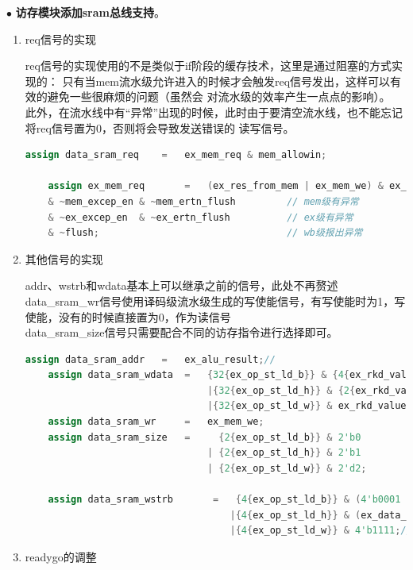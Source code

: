 \documentclass[11pt]{article}
\begin{document}
\noindent
$\bullet$
\textbf{访存模块添加sram总线支持}。
\vspace{1ex}
\begin{enumerate}
  \item req信号的实现
  
  req信号的实现使用的不是类似于if阶段的缓存技术，这里是通过阻塞的方式实现的：
  只有当mem流水级允许进入的时候才会触发req信号发出，这样可以有效的避免一些很麻烦的问题（虽然会
  对流水级的效率产生一点点的影响）。\\
  此外，在流水线中有“异常”出现的时候，此时由于要清空流水线，也不能忘记将req信号置为0，否则将会导致发送错误的
  读写信号。
  \begin{lstlisting}[language=verilog]
    assign data_sram_req    =   ex_mem_req & mem_allowin;

    assign ex_mem_req       =   (ex_res_from_mem | ex_mem_we) & ex_valid 
    & ~mem_excep_en & ~mem_ertn_flush         // mem级有异常
    & ~ex_excep_en  & ~ex_ertn_flush          // ex级有异常
    & ~flush;                                 // wb级报出异常
  \end{lstlisting}
  \item 其他信号的实现
  
  addr、wstrb和wdata基本上可以继承之前的信号，此处不再赘述\\
  data_sram_wr信号使用译码级流水级生成的写使能信号，有写使能时为1，写使能，没有的时候直接置为0，作为读信号\\
  data_sram_size信号只需要配合不同的访存指令进行选择即可。
  \begin{lstlisting}[language=verilog]
    assign data_sram_addr   =   ex_alu_result;//
    assign data_sram_wdata  =   {32{ex_op_st_ld_b}} & {4{ex_rkd_value[7:0]}}
                                |{32{ex_op_st_ld_h}} & {2{ex_rkd_value[15:0]}}
                                |{32{ex_op_st_ld_w}} & ex_rkd_value[31:0];
    assign data_sram_wr     =   ex_mem_we;
    assign data_sram_size   =     {2{ex_op_st_ld_b}} & 2'b0 
                                | {2{ex_op_st_ld_h}} & 2'b1 
                                | {2{ex_op_st_ld_w}} & 2'd2;
    
    assign data_sram_wstrb       =   {4{ex_op_st_ld_b}} & (4'b0001 << ex_data_sram_addr[1:0])          // st.b
                                    |{4{ex_op_st_ld_h}} & (ex_data_sram_addr[1] ? 4'b1100 : 4'b0011)    // st.h
                                    |{4{ex_op_st_ld_w}} & 4'b1111;// st.w

  \end{lstlisting}
  \item readygo的调整


\end{enumerate}
\end{document}
